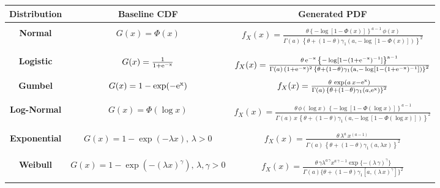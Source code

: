 \documentclass[twoside,leqno,11pt]{article}
\begin{document}
\begin{landscape}
\begin{table}[htbp]\label{tabspecial1}
\centering
\begin{tabular}{c|c|c}
\hline
\textbf{Distribution} & \textbf{Baseline CDF} & \textbf{Generated PDF}  \\
\hline
{} & {} & {} \\
\textbf{Normal} &  $G(x)=\Phi(x)$ & $f_{X}(x)=\frac{\theta  \left\{ -\log[1-\Phi(x)] \right\}^{a-1}\, \phi(x)}{\Gamma(a)\,\left\{\theta+(1-\theta)\gamma_1\left( a, -\log \left[1-\Phi(x)\right]\right)\right\}^{2}}$ \\
{} & {} & {} \\
\hline
{} & {} & {} \\
\textbf{Logistic} &  $G(x)=\frac{1}{1+\rm{e}^{-x}}$ & $f_{X}(x)=\frac{\theta\,\rm{e}^{-x}\, \left\{ -\log[1-(1+\rm{e}^{-x})^{-1}] \right\}^{a-1}}{\Gamma(a)\,(1+\rm{e}^{-x})^{2}\,\left\{\theta+(1-\theta)\gamma_1\left( a, -\log \left[1-(1+\rm{e}^{-x})^{-1}\right]\right)\right\}^{2}}$\\
{} & {} & {} \\
\hline
\textbf{Gumbel} &  $G(x)=1-\exp(-\rm{e}^x)$ & $f_{X}(x)=\frac{\theta \, \exp(a \,x-  \rm{e}^x)}{\Gamma(a)\,\left\{\theta+(1-\theta)\gamma_1\left(a, \rm{e}^{x}\right)\right\}^{2}}$ \\
{} & {} & {} \\
\hline
{} & {} & {} \\
\textbf{Log-Normal} &  $G(x)=\Phi(\log x)$ & $f_{X}(x)=\frac{\theta\,\phi(\log x)\,  \left\{ -\log[1-\Phi(\log x)] \right\}^{a-1}}{\Gamma(a)\,x\,\left\{\theta+(1-\theta)\gamma_1\left( a, -\log \left[1-\Phi(\log x)\right]\right)\right\}^{2}}$ \\
{} & {} & {} \\
\hline
{} & {} & {} \\
\textbf{Exponential} &  $G(x)=1-\exp(-\lambda x),\,\lambda>0$ & $f_{X}(x)=\frac{\theta\,\lambda^{a}\,x^{(a-1)}\, }{\Gamma(a)\,\left\{\theta+(1-\theta)\gamma_1\left(a,\lambda x\right)\right\}^{2}}$ \\
{} & {} & {} \\
\hline
{} & {} & {} \\
\textbf{Weibull} &  $G(x)=1-\exp(-(\lambda x)^\gamma),\,\lambda,\gamma>0$ & $f_X(x)=\frac{\theta\,\gamma\lambda^{a\,\gamma}x^{a\,\gamma-1}\exp\{-(\lambda\,\gamma)^\gamma\}}{\Gamma (a)\{\theta+(1-\theta)\gamma_1[a,(\lambda\,x)^\gamma]\}^2}$ \\
{} & {} & {} \\

\end{tabular}
\end{table}
\end{landscape}
\end{document}
